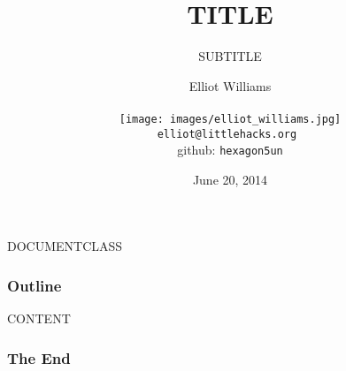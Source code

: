 DOCUMENTCLASS

\usepackage{latexsym} %
\usepackage{minted}
\usepackage{amssymb}
\usepackage{amsmath}
\usepackage{amsfonts}

\usepackage{url}
\usepackage{multimedia}



\newcommand{\leads}{\hspace{1em}$\rightarrow$\hspace{1em}}
\newcommand{\com}[1]{\textcolor{blue}{\bf \tt #1}}
\newcommand{\avg}{\frac{1}{n}\sum_i}
\newcommand{\var}{\mbox{var}}
\newcommand{\cor}{\mbox{cor}}
\newcommand{\cov}{\mbox{cov}}
\newcommand{\plim}{\xrightarrow{p}}

\title{ TITLE }
\subtitle{ SUBTITLE }
\date{June 20, 2014}
\author{Elliot Williams \\ \ \\ \texttt{[image: images/elliot\_williams.jpg]} \\ 
{ \tt elliot@littlehacks.org } \\ 
github: {\tt hexagon5un} 
}


  \begin{frame}
    \titlepage
  \end{frame}

  \begin{frame}[label=outline]
    \frametitle{Outline}
    \tableofcontents
  \end{frame}


  CONTENT

   

  \begin{frame}[label=theEnd]
    \frametitle{The End}
    \hyperlink{outline}{}
  \end{frame}






